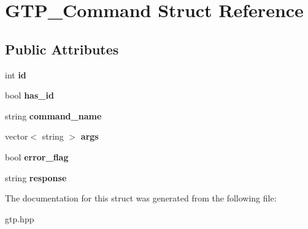 \hypertarget{struct_g_t_p___command}{\section{G\-T\-P\-\_\-\-Command Struct Reference}
\label{struct_g_t_p___command}
}
\subsection*{Public Attributes}
\begin{DoxyCompactItemize}
\item 
\hypertarget{struct_g_t_p___command_a5410c5b4d614d21b4e910cf8ce50b778}{int {\bfseries id}}\label{struct_g_t_p___command_a5410c5b4d614d21b4e910cf8ce50b778}

\item 
\hypertarget{struct_g_t_p___command_ad7d24217f992437900c4b4d59a4edb6d}{bool {\bfseries has\-\_\-id}}\label{struct_g_t_p___command_ad7d24217f992437900c4b4d59a4edb6d}

\item 
\hypertarget{struct_g_t_p___command_abc8973d71330adb1deb20c20c6233a63}{string {\bfseries command\-\_\-name}}\label{struct_g_t_p___command_abc8973d71330adb1deb20c20c6233a63}

\item 
\hypertarget{struct_g_t_p___command_a7099195267ede90e7fbc8c285a54d9d4}{vector$<$ string $>$ {\bfseries args}}\label{struct_g_t_p___command_a7099195267ede90e7fbc8c285a54d9d4}

\item 
\hypertarget{struct_g_t_p___command_a77e56c8aca4528de8c4f9ead5a4a9383}{bool {\bfseries error\-\_\-flag}}\label{struct_g_t_p___command_a77e56c8aca4528de8c4f9ead5a4a9383}

\item 
\hypertarget{struct_g_t_p___command_a9a69b54f08c7a0f425767652902463bb}{string {\bfseries response}}\label{struct_g_t_p___command_a9a69b54f08c7a0f425767652902463bb}

\end{DoxyCompactItemize}


The documentation for this struct was generated from the following file\-:\begin{DoxyCompactItemize}
\item 
gtp.\-hpp\end{DoxyCompactItemize}
